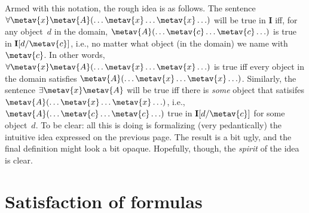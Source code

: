 Armed with this notation, the rough idea is as follows. The sentence $\forall \metav{x}\metav{A}(\ldots \metav{x} \ldots \metav{x} \ldots)$ will be true in $\mathbf{I}$ iff, for any object~$d$ in the domain, $\metav{A}(\ldots \metav{c} \ldots \metav{c}\ldots)$ is true in $\mathbf{I}[d/\metav{c}]$, i.e., no matter what object (in the domain) we name with $\metav{c}$. In other words, $\forall \metav{x} \metav{A}(\ldots \metav{x} \ldots \metav{x} \ldots)$ is true iff every object in the domain satisfies $\metav{A}(\ldots \metav{x} \ldots \metav{x} \ldots)$. Similarly, the sentence $\exists \metav{x}\metav{A}$ will be true iff there is \emph{some} object that satisifes $\metav{A}(\ldots \metav{x} \ldots \metav{x} \ldots)$, i.e., $\metav{A}(\ldots \metav{c} \ldots \metav{c} \ldots)$ true in $\mathbf{I}[d/\metav{c}]$ for some object~$d$.
To be clear: all this is doing is formalizing (very pedantically) the intuitive idea expressed on the previous page. The result is a bit ugly, and the final definition might look a bit opaque. Hopefully, though, the \emph{spirit} of the idea is clear. 

\section{Satisfaction of formulas}

